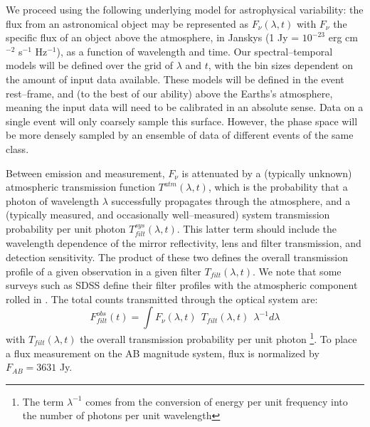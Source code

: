 We proceed using the following underlying model for astrophysical variability:
the flux from an astronomical object may be represented as $F_\nu(\lambda, t)$
with $F_\nu$ the specific flux of an object above the atmosphere, in Janskys (1
Jy = $10^{-23}$ erg cm$^{-2}$ s$^{-1}$ Hz$^{-1}$), as a function of wavelength
and time.  Our spectral--temporal models will be defined over the grid of
$\lambda$ and $t$, with the bin sizes dependent on the amount of input data
available.  These models will be defined in the event rest--frame, and (to the
best of our ability) above the Earths's atmosphere, meaning the input data will
need to be calibrated in an absolute sense. Data on a single event will only
coarsely sample this surface.  However, the phase space will be more densely
sampled by an ensemble of data of different events of the same class.

Between emission and measurement, $F_\nu$ is attenuated by a (typically unknown)
atmospheric transmission function $T^{atm}(\lambda, t)$, which is the
probability that a photon of wavelength $\lambda$ successfully propagates
through the atmosphere, and a (typically measured, and occasionally
well--measured) system transmission probability per unit photon
$T^{sys}_{filt}(\lambda, t)$.  This latter term should include the wavelength
dependence of the mirror reflectivity, lens and filter transmission, and
detection sensitivity.  The product of these two defines the overall
transmission profile of a given observation in a given filter $T_{filt}(\lambda,
t)$.  We note that some surveys such as SDSS define their filter profiles with
the atmospheric component rolled in \citep{2007AJ....134..973I}. The total
counts transmitted through the optical system are: $$F^{obs}_{filt} (t) = \int
F_\nu(\lambda, t) ~~ T_{filt} (\lambda, t) ~~ \lambda^{-1} d\lambda$$ with
$T_{filt}(\lambda, t)$  the overall transmission probability per unit photon
\footnote{The term $\lambda^{-1}$ comes from the conversion of energy per unit
frequency into the number of photons per unit wavelength}. To place a flux
measurement on the AB magnitude system, flux is normalized by $F_{AB} = 3631$
Jy.

